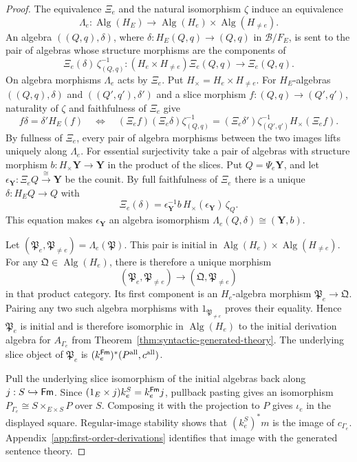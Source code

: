 \begin{proof}
The equivalence $\Xi_e$ and the natural isomorphism $\zeta$
induce an equivalence
\[
 \Lambda_e:\operatorname{Alg}(H_E)\longrightarrow
             \operatorname{Alg}(H_e)\times
             \operatorname{Alg}(H_{\ne e}).
\]
An algebra $((Q,q),\delta)$, where
$\delta:H_E(Q,q)\to(Q,q)$ in $\mathcal B/F_E$, is sent
to the pair of algebras whose structure morphisms are the
components of
\[
 \Xi_e(\delta)\,\zeta_{(Q,q)}^{-1}:
 (H_e\times H_{\ne e})\Xi_e(Q,q)\longrightarrow\Xi_e(Q,q).
\]
On algebra morphisms $\Lambda_e$ acts by $\Xi_e$. Put
$H_\times=H_e\times H_{\ne e}$. For $H_E$-algebras
$((Q,q),\delta)$ and $((Q',q'),\delta')$ and a slice morphism
$f:(Q,q)\to(Q',q')$, naturality of $\zeta$ and faithfulness of $\Xi_e$ give
\[
 f\delta=\delta' H_E(f)
 \quad\Longleftrightarrow\quad
 (\Xi_e f)(\Xi_e\delta)\zeta_{(Q,q)}^{-1}
   =(\Xi_e\delta')\zeta_{(Q',q')}^{-1} H_\times(\Xi_e f).
\]
By fullness of $\Xi_e$, every pair of
algebra morphisms between the two images lifts uniquely along
$\Lambda_e$.
For essential surjectivity take a pair
of algebras with structure morphism
$b:H_\times\mathbf Y\to\mathbf Y$ in the product of the slices.
Put $Q=\Psi_e\mathbf Y$, and let
$\epsilon_{\mathbf Y}:\Xi_e Q\xrightarrow{\cong}\mathbf Y$ be the counit.
By full faithfulness of $\Xi_e$ there is a unique
$\delta:H_E Q\to Q$ with
\[
 \Xi_e(\delta)=\epsilon_{\mathbf Y}^{-1}b\,H_\times(\epsilon_{\mathbf Y})\,\zeta_Q .
\]
This equation makes $\epsilon_{\mathbf Y}$ an algebra isomorphism
$\Lambda_e(Q,\delta)\cong(\mathbf Y,b)$.

Let $(\mathfrak P_e,\mathfrak P_{\ne e})=\Lambda_e(\mathfrak P)$.
This pair is initial in
$\operatorname{Alg}(H_e)\times\operatorname{Alg}(H_{\ne e})$.
For any $\mathfrak Q\in\operatorname{Alg}(H_e)$, there is
therefore a unique morphism
\[
 (\mathfrak P_e,\mathfrak P_{\ne e})\longrightarrow
 (\mathfrak Q,\mathfrak P_{\ne e})
\]
in that product category. Its first component is an
$H_e$-algebra morphism $\mathfrak P_e\to\mathfrak Q$.
Pairing any two such algebra morphisms with
$1_{\mathfrak P_{\ne e}}$ proves their equality. Hence
$\mathfrak P_e$ is initial and is therefore isomorphic in
$\operatorname{Alg}(H_e)$ to the initial derivation algebra for
$A_{\Gamma_e}$ from Theorem~\ref{thm:syntactic-generated-theory}.
The underlying slice object of $\mathfrak P_e$ is
$(k_e^{\mathsf{Fm}})^*(P^{\mathrm{all}},c^{\mathrm{all}})$.

Pull the underlying slice isomorphism of the initial algebras back along
$j:S\hookrightarrow\mathsf{Fm}$. Since $(1_E\times j)k_e^S=k_e^{\mathsf{Fm}}j$,
pullback pasting gives an isomorphism
$P_{\Gamma_e}\cong S\times_{E\times S}P$ over $S$.
Composing it with the projection to $P$ gives $\iota_e$ in the
displayed square. Regular-image stability shows that
$(k_e^S)^*m$ is the image of $c_{\Gamma_e}$.
Appendix~\ref{app:first-order-derivations} identifies that image
with the generated sentence theory.
\end{proof}

